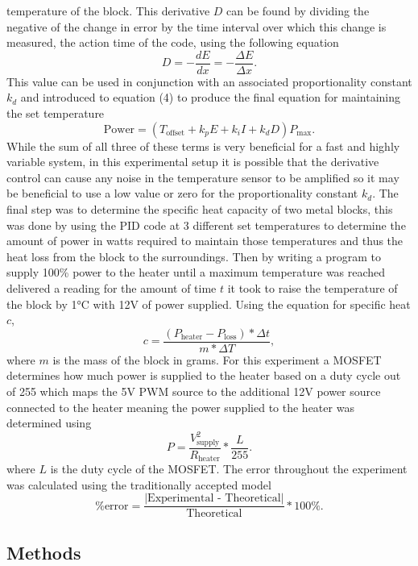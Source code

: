 \documentclass[11pt]{article}
\begin{document}
temperature of the block. This derivative \(D\) can be found by dividing
the negative of the change in error by the time interval over which this
change is measured, the action time of the code, using the following
equation
\[D = - \frac{dE}{dx} = - \frac{\Delta{E}}{\Delta{x}}. \tag{5}\] This
value can be used in conjunction with an associated proportionality
constant \(k_d\) and introduced to equation (4) to produce the final
equation for maintaining the set temperature
\[\text{Power} = ( T_{\text{offset}} + k_p E + k_i I + k_d D) P_{\text{max}}. \tag{6}\]
While the sum of all three of these terms is very beneficial for a fast
and highly variable system, in this experimental setup it is possible
that the derivative control can cause any noise in the temperature
sensor to be amplified so it may be beneficial to use a low value or
zero for the proportionality constant \(k_d\). The final step was to
determine the specific heat capacity of two metal blocks, this was done
by using the PID code at 3 different set temperatures to determine the
amount of power in watts required to maintain those temperatures and
thus the heat loss from the block to the surroundings. Then by writing a
program to supply 100\% power to the heater until a maximum temperature
was reached delivered a reading for the amount of time \(t\) it took to
raise the temperature of the block by 1°C with 12V of power supplied.
Using the equation for specific heat \(c\),
\[ c = \frac{(P_{\text{heater}} - P_{\text{loss}}) * \Delta{t}}{m * \Delta{T}}, \tag{7}\]
where \(m\) is the mass of the block in grams. For this experiment a
MOSFET determines how much power is supplied to the heater based on a
duty cycle out of 255 which maps the 5V PWM source to the additional 12V
power source connected to the heater meaning the power supplied to the
heater was determined using
\[ P = \frac{V^2_{\text{supply}}}{R_{\text{heater}}} * \frac{L}{255}. \tag{8}\]
where \(L\) is the duty cycle of the MOSFET. The error throughout the
experiment was calculated using the traditionally accepted model
\[ \text{\%error} = \frac{\text{|Experimental - Theoretical|}}{\text{Theoretical}} * 100\%. \tag{9}\]

    \hypertarget{methods}{%
\subsection{Methods}\label{methods}}
\end{document}
